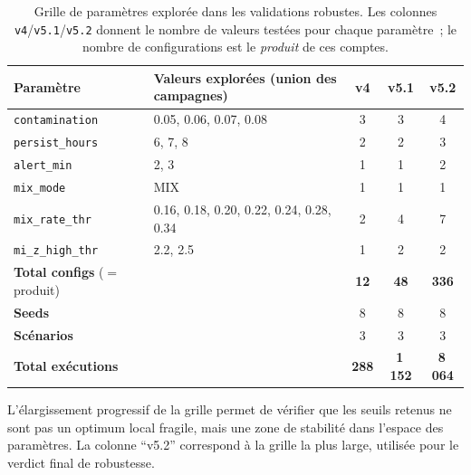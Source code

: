 \begin{table}[H]
    \centering
    \small
    \caption{Grille de paramètres explorée dans les validations robustes. Les colonnes
    \texttt{v4}/\texttt{v5.1}/\texttt{v5.2} donnent le nombre de valeurs testées pour
    chaque paramètre~; le nombre de configurations est le \emph{produit} de ces comptes.}
    \label{tab:grille_complete}
    \setlength{\tabcolsep}{4pt}
    \begin{tabular}{llccc}
        \toprule
        \textbf{Paramètre} & \textbf{Valeurs explorées (union des campagnes)}
            & \textbf{v4} & \textbf{v5.1} & \textbf{v5.2} \\
        \midrule
        \texttt{contamination}    & 0.05, 0.06, 0.07, 0.08
            & 3 & 3 & 4 \\
        \texttt{persist\_hours}   & 6, 7, 8
            & 2 & 2 & 3 \\
        \texttt{alert\_min}       & 2, 3
            & 1 & 1 & 2 \\
        \texttt{mix\_mode}        & MIX
            & 1 & 1 & 1 \\
        \texttt{mix\_rate\_thr}   & 0.16, 0.18, 0.20, 0.22, 0.24, 0.28, 0.34
            & 2 & 4 & 7 \\
        \texttt{mi\_z\_high\_thr} & 2.2, 2.5
            & 1 & 2 & 2 \\
        \midrule
        \textbf{Total configs} ($=$ produit) &
            & \textbf{12} & \textbf{48} & \textbf{336} \\
        \textbf{Seeds}            &
            & 8 & 8 & 8 \\
        \textbf{Scénarios}        &
            & 3 & 3 & 3 \\
        \textbf{Total exécutions}       &
            & \textbf{288} & \textbf{1\,152} & \textbf{8\,064} \\
        \bottomrule
    \end{tabular}
\end{table}

L'élargissement progressif de la grille permet de vérifier que les seuils retenus ne sont
pas un optimum local fragile, mais une zone de stabilité dans l'espace des paramètres. La
colonne ``v5.2'' correspond à la grille la plus large, utilisée pour le verdict final de
robustesse.


